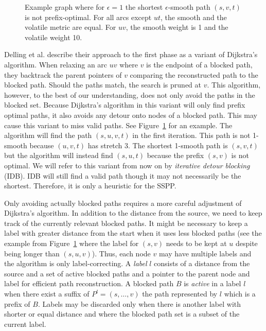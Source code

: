 \documentclass[a4paper,UKenglish,cleveref, autoref, thm-restate]{lipics-v2021}
\begin{document}
\begin{figure}
\centering
{}
\caption{Example graph where for $\epsilon = 1$ the shortest $\epsilon$-smooth path $(s,v,t)$ is not prefix-optimal. For all arcs except $ut$, the smooth and the volatile metric are equal. For $uv$, the smooth weight is 1 and the volatile weight 10.}
\label{fig:ipb_counterexample}
\end{figure}

Delling et al. describe their approach to the first phase as a variant of Dijkstra's algorithm.
When relaxing an arc $uv$ where $v$ is the endpoint of a blocked path, they backtrack the parent pointers of $v$ comparing the reconstructed path to the blocked path.
Should the paths match, the search is pruned at $v$.
This algorithm, however, to the best of our understanding, does not only avoid the paths in the blocked set.
Because Dijkstra's algorithm in this variant will only find prefix optimal paths, it also avoids any detour onto nodes of a blocked path.
This may cause this variant to miss valid paths.
See Figure~\ref{fig:ipb_counterexample} for an example.
The algorithm will find the path $(s,u,v,t)$ in the first iteration.
This path is not 1-smooth because $(u,v,t)$ has stretch 3.
The shortest 1-smooth path is $(s,v,t)$ but the algorithm will instead find $(s,u,t)$ because the prefix $(s,v)$ is not optimal.
We will refer to this variant from now on by \emph{iterative detour blocking} (IDB).
IDB will still find a valid path though it may not necessarily be the shortest.
Therefore, it is only a heuristic for the SSPP.

Only avoiding actually blocked paths requires a more careful adjustment of Dijkstra's algorithm.
In addition to the distance from the source, we need to keep track of the currently relevant blocked paths.
It might be necessary to keep a label with greater distance from the start when it uses less blocked paths (see the example from Figure~\ref{fig:ipb_counterexample} where the label for $(s,v)$ needs to be kept at $u$ despite being longer than $(s,u,v)$).
Thus, each node $v$ may have multiple labels and the algorithm is only label-correcting.
A \emph{label} $l$ consists of a distance from the source and a set of active blocked paths and a pointer to the parent node and label for efficient path reconstruction.
A blocked path $B$ is \emph{active} in a label $l$ when there exist a suffix of $P^l = (s,\dots,v)$ the path represented by $l$ which is a prefix of $B$.
Labels may be discarded only when there is another label with shorter or equal distance and where the blocked path set is a subset of the current label.
\end{document}
